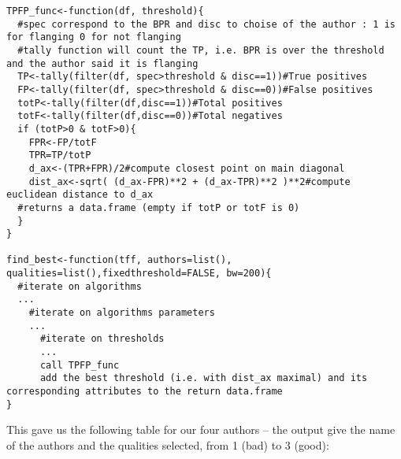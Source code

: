 \begin{lstlisting}[style=Rstyle, caption={\tt find\_ best.R},label=code:findbest]
TPFP_func<-function(df, threshold){
  #spec correspond to the BPR and disc to choise of the author : 1 is for flanging 0 for not flanging
  #tally function will count the TP, i.e. BPR is over the threshold and the author said it is flanging
  TP<-tally(filter(df, spec>threshold & disc==1))#True positives
  FP<-tally(filter(df, spec>threshold & disc==0))#False positives
  totP<-tally(filter(df,disc==1))#Total positives
  totF<-tally(filter(df,disc==0))#Total negatives
  if (totP>0 & totF>0){
    FPR<-FP/totF
    TPR=TP/totP
    d_ax<-(TPR+FPR)/2#compute closest point on main diagonal
    dist_ax<-sqrt( (d_ax-FPR)**2 + (d_ax-TPR)**2 )**2#compute euclidean distance to d_ax
  #returns a data.frame (empty if totP or totF is 0)
  }
}

find_best<-function(tff, authors=list(), qualities=list(),fixedthreshold=FALSE, bw=200){
  #iterate on algorithms
  ...
    #iterate on algorithms parameters
    ...
      #iterate on thresholds
      ...
      call TPFP_func
      add the best threshold (i.e. with dist_ax maximal) and its corresponding attributes to the return data.frame
}
\end{lstlisting}

This gave us the following table for our four authors -- the output give the name of the authors and the qualities selected, from 1 (bad) to 3 (good):











